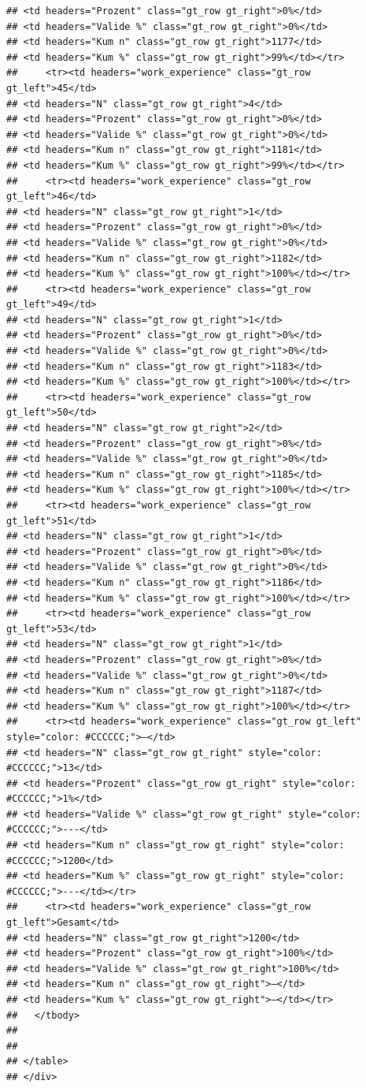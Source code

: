 \documentclass[
  a4paper,
  DIV=11,
  numbers=noendperiod]{scrartcl}
\begin{document}
\begin{verbatim}
## <td headers="Prozent" class="gt_row gt_right">0%</td>
## <td headers="Valide %" class="gt_row gt_right">0%</td>
## <td headers="Kum n" class="gt_row gt_right">1177</td>
## <td headers="Kum %" class="gt_row gt_right">99%</td></tr>
##     <tr><td headers="work_experience" class="gt_row gt_left">45</td>
## <td headers="N" class="gt_row gt_right">4</td>
## <td headers="Prozent" class="gt_row gt_right">0%</td>
## <td headers="Valide %" class="gt_row gt_right">0%</td>
## <td headers="Kum n" class="gt_row gt_right">1181</td>
## <td headers="Kum %" class="gt_row gt_right">99%</td></tr>
##     <tr><td headers="work_experience" class="gt_row gt_left">46</td>
## <td headers="N" class="gt_row gt_right">1</td>
## <td headers="Prozent" class="gt_row gt_right">0%</td>
## <td headers="Valide %" class="gt_row gt_right">0%</td>
## <td headers="Kum n" class="gt_row gt_right">1182</td>
## <td headers="Kum %" class="gt_row gt_right">100%</td></tr>
##     <tr><td headers="work_experience" class="gt_row gt_left">49</td>
## <td headers="N" class="gt_row gt_right">1</td>
## <td headers="Prozent" class="gt_row gt_right">0%</td>
## <td headers="Valide %" class="gt_row gt_right">0%</td>
## <td headers="Kum n" class="gt_row gt_right">1183</td>
## <td headers="Kum %" class="gt_row gt_right">100%</td></tr>
##     <tr><td headers="work_experience" class="gt_row gt_left">50</td>
## <td headers="N" class="gt_row gt_right">2</td>
## <td headers="Prozent" class="gt_row gt_right">0%</td>
## <td headers="Valide %" class="gt_row gt_right">0%</td>
## <td headers="Kum n" class="gt_row gt_right">1185</td>
## <td headers="Kum %" class="gt_row gt_right">100%</td></tr>
##     <tr><td headers="work_experience" class="gt_row gt_left">51</td>
## <td headers="N" class="gt_row gt_right">1</td>
## <td headers="Prozent" class="gt_row gt_right">0%</td>
## <td headers="Valide %" class="gt_row gt_right">0%</td>
## <td headers="Kum n" class="gt_row gt_right">1186</td>
## <td headers="Kum %" class="gt_row gt_right">100%</td></tr>
##     <tr><td headers="work_experience" class="gt_row gt_left">53</td>
## <td headers="N" class="gt_row gt_right">1</td>
## <td headers="Prozent" class="gt_row gt_right">0%</td>
## <td headers="Valide %" class="gt_row gt_right">0%</td>
## <td headers="Kum n" class="gt_row gt_right">1187</td>
## <td headers="Kum %" class="gt_row gt_right">100%</td></tr>
##     <tr><td headers="work_experience" class="gt_row gt_left" style="color: #CCCCCC;">—</td>
## <td headers="N" class="gt_row gt_right" style="color: #CCCCCC;">13</td>
## <td headers="Prozent" class="gt_row gt_right" style="color: #CCCCCC;">1%</td>
## <td headers="Valide %" class="gt_row gt_right" style="color: #CCCCCC;">---</td>
## <td headers="Kum n" class="gt_row gt_right" style="color: #CCCCCC;">1200</td>
## <td headers="Kum %" class="gt_row gt_right" style="color: #CCCCCC;">---</td></tr>
##     <tr><td headers="work_experience" class="gt_row gt_left">Gesamt</td>
## <td headers="N" class="gt_row gt_right">1200</td>
## <td headers="Prozent" class="gt_row gt_right">100%</td>
## <td headers="Valide %" class="gt_row gt_right">100%</td>
## <td headers="Kum n" class="gt_row gt_right">—</td>
## <td headers="Kum %" class="gt_row gt_right">—</td></tr>
##   </tbody>
##   
##   
## </table>
## </div>
\end{verbatim}
\end{document}
